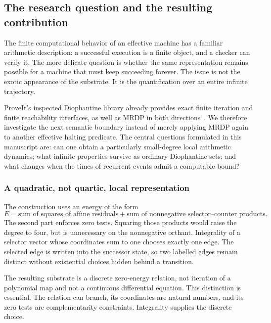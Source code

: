 \documentclass[11pt,letterpaper]{article}
\theoremstyle{definition}
\theoremstyle{remark}
\newcommand{\1}{\mathbf 1}
\newcommand{\srctag}[1]{\texorpdfstring{\hspace{0.4em}{\normalfont\small\color{accent}[source #1]}}{ [source #1]}}
\begin{document}
\subsection{The research question and the resulting contribution\srctag{03}}

The finite computational behavior of an effective machine has a familiar
arithmetic description: a successful execution is a finite object, and a
checker can verify it. The more delicate question is whether the same
representation remains possible for a machine that must keep succeeding
forever. The issue is not the exotic appearance of the substrate. It is the
quantification over an entire infinite trajectory.

ProveIt's inspected Diophantine library already provides exact finite
iteration and finite reachability interfaces, as well as MRDP in both
directions~\cite{proveit-trace,qd-proveit-readme}. We therefore investigate the next
semantic boundary instead of merely applying MRDP again to another effective
halting predicate. The central questions formulated in this manuscript are:
can one obtain a particularly small-degree local arithmetic dynamics;
what infinite properties survive as ordinary Diophantine sets; and what
changes when the times of recurrent events admit a computable bound?

\subsubsection{A quadratic, not quartic, local representation}

The construction uses an energy of the form
\begin{equation}\label{lbh:qd:eq:informalenergy}
 E=\text{sum of squares of affine residuals}
       +\text{sum of nonnegative selector--counter products}.
\end{equation}
The second part enforces zero tests. Squaring those products would raise the
degree to four, but is unnecessary on the nonnegative orthant. Integrality of
a selector vector whose coordinates sum to one chooses exactly one edge.
The selected edge is written into the successor state, so two labelled edges
remain distinct without existential choices hidden behind a transition.

The resulting substrate is a discrete zero-energy relation, not iteration of
a polynomial map and not a continuous differential equation. This distinction
is essential. The relation can branch, its coordinates are natural numbers,
and its zero tests are complementarity constraints. Integrality supplies
the discrete choice.
\end{document}
